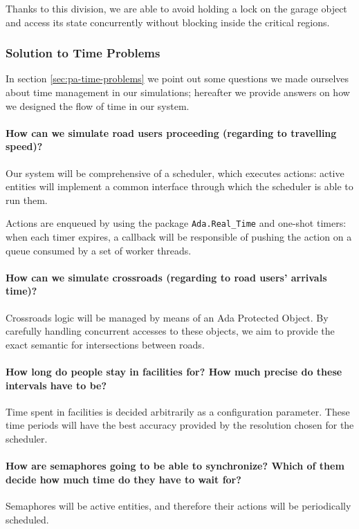 Thanks to this division, we are able to avoid holding a lock on the garage
object and access its state concurrently without blocking inside the critical
regions.


\subsubsection{Solution to Time Problems}

In section \ref{sec:pa-time-problems} we point out some questions we made
ourselves about time management in our simulations; hereafter we provide
answers on how we designed the flow of time in our system.

\paragraph{How can we simulate road users proceeding (regarding to travelling
  speed)?}
Our system will be comprehensive of a scheduler, which executes actions:
active entities will implement a common interface through which the scheduler
is able to run them.

Actions are enqueued by using the package \texttt{Ada.Real\_Time} and one-shot
timers: when each timer expires, a callback will be responsible of pushing the
action on a queue consumed by a set of worker threads.

\paragraph{How can we simulate crossroads (regarding to road users' arrivals
  time)?}
Crossroads logic will be managed by means of an Ada Protected Object. By
carefully handling concurrent accesses to these objects, we aim to provide the
exact semantic for intersections between roads.

\paragraph{How long do people stay in facilities for? How much precise do these
  intervals have to be?}
Time spent in facilities is decided arbitrarily as a configuration parameter.
These time periods will have the best accuracy provided by the resolution
chosen for the scheduler.

\paragraph{How are semaphores going to be able to synchronize? Which of them
  decide how much time do they have to wait for?}
Semaphores will be active entities, and therefore their actions will be
periodically scheduled.

